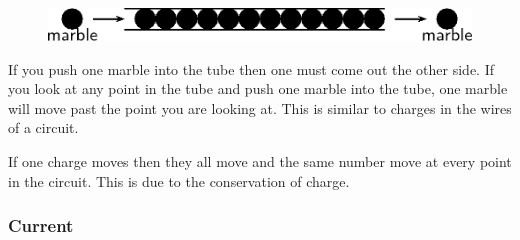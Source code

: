 	\begin{figure}[H] %
    \begin{center}
    \label{m38773*id66705!!!underscore!!!media}\label{m38773*id66705!!!underscore!!!printimage}\includegraphics{col11305.imgs/m38773_PG10C9_025.png} %
        
      \vspace{2pt}
    \vspace{.1in}
    
    \end{center}

 \end{figure}   

    \addtocounter{footnote}{-0}
    
        \par 
        \label{m38773*id66712}If you push one marble into the tube then one must come out the other side. If you look at any point in the tube and push one marble into the tube, one marble will move past the point you are looking at. This is similar to charges in the wires of a circuit.\par 
        \label{m38773*id66717}If one charge moves then they all move and the same number move at every point in the circuit. This is due to the conservation of charge.\par 
      
      \label{m38773*uid47}
            \subsubsection{ Current}
            \nopagebreak
            
